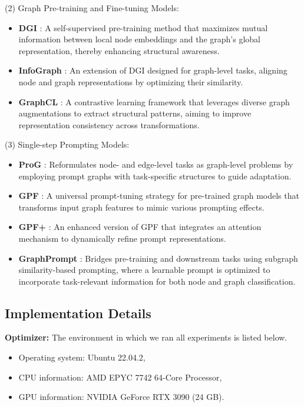 \noindent (2) Graph Pre-training and Fine-tuning Models:
\begin{itemize}[leftmargin=*]
    \item \textbf{DGI} \cite{velivckovic2017graph}: A self-supervised pre-training method that maximizes mutual information between local node embeddings and the graph’s global representation, thereby enhancing structural awareness.
    \item \textbf{InfoGraph} \cite{sun2019infograph}: An extension of DGI designed for graph-level tasks, aligning node and graph representations by optimizing their similarity.
    \item \textbf{GraphCL} \cite{you2020graph}: A contrastive learning framework that leverages diverse graph augmentations to extract structural patterns, aiming to improve representation consistency across transformations.
\end{itemize}

\noindent (3) Single-step Prompting Models:
\begin{itemize}[leftmargin=*]
    \item \textbf{ProG} \cite{sun2023all}: Reformulates node- and edge-level tasks as graph-level problems by employing prompt graphs with task-specific structures to guide adaptation.
    \item \textbf{GPF} \cite{fang2024universal}: A universal prompt-tuning strategy for pre-trained graph models that transforms input graph features to mimic various prompting effects.
    \item \textbf{GPF+} \cite{fang2024universal}: An enhanced version of GPF that integrates an attention mechanism to dynamically refine prompt representations.
    \item \textbf{GraphPrompt} \cite{liu2023graphprompt}: Bridges pre-training and downstream tasks using subgraph similarity-based prompting, where a learnable prompt is optimized to incorporate task-relevant information for both node and graph classification.
\end{itemize}

\subsection{Implementation Details} \label{app.parameters}

\label{app.general-setting}
\textbf{Optimizer:} 
The environment in which we ran all experiments is listed below.
\begin{itemize}
   \item Operating system: Ubuntu 22.04.2,
   \item CPU information: AMD EPYC 7742 64-Core Processor,
   \item GPU information: NVIDIA GeForce RTX 3090 (24 GB).
\end{itemize}

